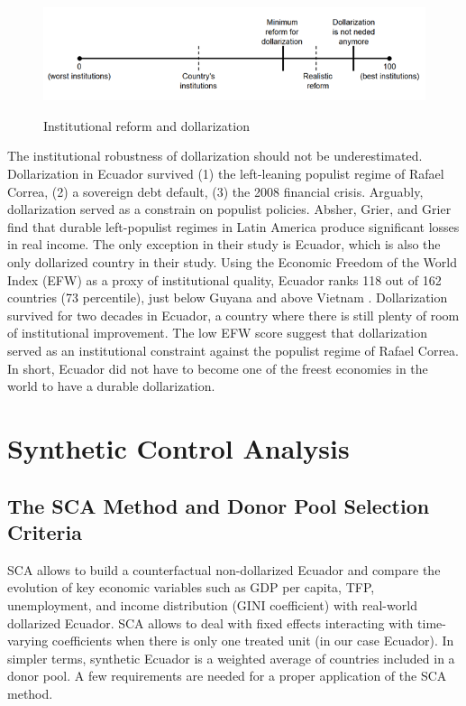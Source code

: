 \documentclass[12pt]{article}
\begin{document}
\begin{figure}[!htbp]
    \caption{Institutional reform and dollarization}
    \centering
    \includegraphics{Figures/Fig_01.png}
    \label{fig:Fig01}
\end{figure}

The institutional robustness of dollarization should not be underestimated. Dollarization in Ecuador survived (1) the left-leaning populist regime of Rafael Correa, (2) a sovereign debt default, (3) the 2008 financial crisis. Arguably, dollarization served as a constrain on populist policies. Absher, Grier, and Grier \parencite*{Absher2020} find that durable left-populist regimes in Latin America produce significant losses in real income. The only exception in their study is Ecuador, which is also the only dollarized country in their study. Using the Economic Freedom of the World Index (EFW) as a proxy of institutional quality, Ecuador ranks 118 out of 162 countries (73 percentile), just below Guyana and above Vietnam \parencite{EFW_2019}. Dollarization survived for two decades in Ecuador, a country where there is still plenty of room of institutional improvement. The low EFW score suggest that dollarization served as an institutional constraint against the populist regime of Rafael Correa. In short, Ecuador did not have to become one of the freest economies in the world to have a durable dollarization.


\section{Synthetic Control Analysis}
    \label{sec:SCA}

\subsection{The SCA Method and Donor Pool Selection Criteria}

SCA allows to build a counterfactual non-dollarized Ecuador and compare the evolution of key economic variables such as GDP per capita, TFP, unemployment, and income distribution (GINI coefficient) with real-world dollarized Ecuador. SCA allows to deal with fixed effects interacting with time-varying coefficients when there is only one treated unit (in our case Ecuador). In simpler terms, synthetic Ecuador is a weighted average of countries included in a donor pool. A few requirements are needed for a proper application of the SCA method.
\end{document}
